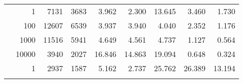 \begin{table}
\begin{tabular}{rrrrrrrrr}
	            
	        
				\noalign{\smallskip}\hline
				\multirow{ 4 }{*}{ 1000000 } &
				
					
					 
					\multirow{ 1 }{*}{ 1 } &
					
						
							    
							     7131  & 3683  
	                           & 3.962 & 2.300 & 13.645
	                           & 3.460 & 1.730  \\
	                
	            
					 &  
					 
					\multirow{ 1 }{*}{ 100 } &
					
						
							    
							     12607  & 6539  
	                           & 3.937 & 3.940 & 4.040
	                           & 2.352 & 1.176  \\
	                
	            
					 &  
					 
					\multirow{ 1 }{*}{ 1000 } &
					
						
							    
							     11516  & 5941  
	                           & 4.649 & 4.561 & 4.737
	                           & 1.127 & 0.564  \\
	                
	            
					 &  
					 
					\multirow{ 1 }{*}{ 10000 } &
					
						
							    
							     3940  & 2027  
	                           & 16.846 & 14.863 & 19.094
	                           & 0.648 & 0.324  \\
	                
	            
	        
				\noalign{\smallskip}\hline
				\multirow{ 4 }{*}{ 2000000 } &
				
					
					 
					\multirow{ 1 }{*}{ 1 } &
					
						
							    
							     2937  & 1587  
	                           & 5.162 & 2.737 & 25.762
	                           & 26.389 & 13.194  \\
	                
	            
					 &  
					 

\end{tabular}
\end{table}
